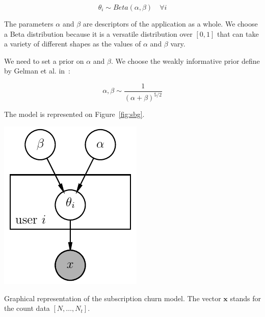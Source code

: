 \documentclass{tufte-book}
\begin{document}
\begin{equation}
  \theta_i \sim Beta(\alpha, \beta) \quad \forall i
\end{equation}

The parameters $\alpha$ and $\beta$ are descriptors of the application as a whole. We choose a Beta
distribution because it is a versatile distribution over $\left[0,1\right]$ that can take a variety of
different shapes as the values of $\alpha$ and $\beta$ vary.

We need to set a prior on $\alpha$ and $\beta$. We choose the weakly informative prior define by Gelman et al.
in~\cite{Gelman2014}:

\begin{equation}
  \alpha, \beta \sim \frac{1}{\left(\alpha+\beta\right)^{5/2}}
\end{equation}

The model is represented on Figure~\ref{fig:sbg}.

\begin{marginfigure}
  \centering
  \includegraphics[width=\linewidth]{./figures/shifted_beta_geometric.pdf}
  \caption{Graphical representation of the subscription churn model. The vector $\mathbf{x}$ stands for the
  count data $[N, \dots, N_t]$.\label{fig:sbg}}
\end{marginfigure}
\end{document}
